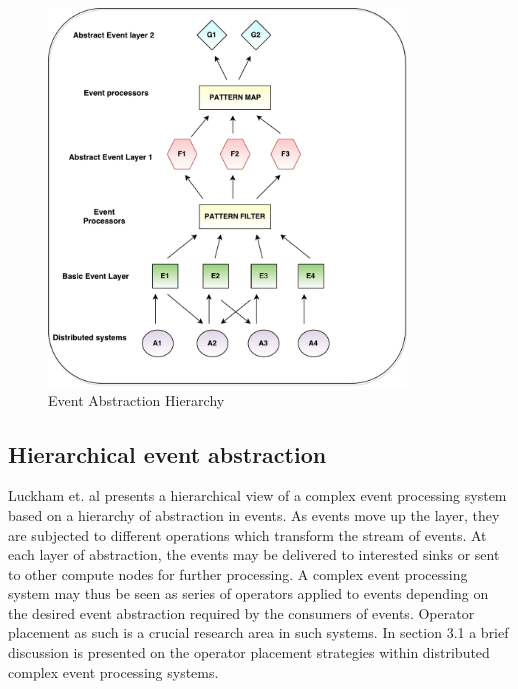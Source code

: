 \begin{figure}[H]
	\centering
	\caption{Event Abstraction Hierarchy}
	\includegraphics[height=10cm]{Luckham.pdf}
\end{figure}

\subsection{Hierarchical event abstraction}
Luckham et. al \cite{luckham1998complex} presents a hierarchical view of a complex event processing system based on a hierarchy of abstraction in events. As events move up the layer, they are subjected to different operations which transform the stream of events. At each layer of abstraction, the events may be delivered to interested sinks or sent to other compute nodes for further processing. A complex event processing system may thus be seen as series of operators applied to events depending on the desired event abstraction required by the consumers of events. Operator placement as such is a crucial research area in such systems. In section 3.1 a brief discussion is presented on the operator placement strategies within distributed complex event processing systems. 

